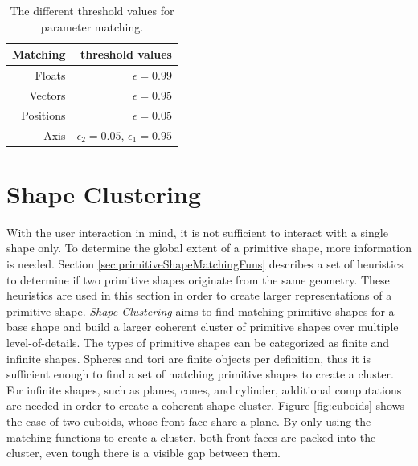 \begin{table}
\centering
\begin{tabular}{ r | r }
    Matching    & threshold values \\
    \hline
  Floats         & $\epsilon = 0.99$ \\
    Vectors     & $\epsilon = 0.95$ \\
  Positions & $\epsilon = 0.05$ \\ 
    Axis             & $\epsilon_2 = 0.05$, $\epsilon_1 = 0.95$ \\  

\end{tabular}
\caption{The different threshold values for parameter matching.}
\label{tab:matchingThresholds}
\end{table}


\section{Shape Clustering}
\label{sec:ShapeClustering}

With the user interaction in mind, it is not sufficient to interact with a single shape only. To determine the global extent of a primitive shape, more information is needed. Section \ref{sec:primitiveShapeMatchingFuns} describes a set of heuristics to determine if two primitive shapes originate from the same geometry. These heuristics are used in this section in order to create larger representations of a primitive shape. 
\textit{Shape Clustering} aims to find matching primitive shapes for a base shape and build a larger coherent cluster of primitive shapes over multiple level-of-details. The types of primitive shapes can be categorized as finite and infinite shapes. Spheres and tori are finite objects per definition, thus it is sufficient enough to find a set of matching primitive shapes to create a cluster. For infinite shapes, such as planes, cones, and cylinder, additional computations are needed in order to create a coherent shape cluster. Figure \ref{fig:cuboids} shows the case of two cuboids, whose front face share a plane. By only using the matching functions to create a cluster, both front faces are packed into the cluster, even tough there is a visible gap between them.

